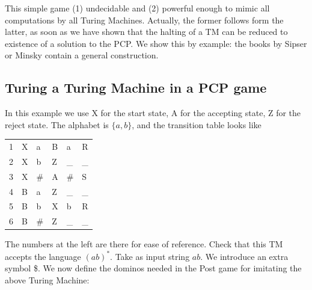 This simple game (1) undecidable and (2) powerful enough to mimic all
computations by all Turing Machines. Actually, the former follows form
the latter, as soon as we have shown that the halting of a TM can be
reduced to existence of a solution to the PCP. We show this by
example: the books by Sipser or Minsky contain a general construction.

\subsection{Turing a Turing Machine in a PCP game}

In this example we use X for the start state, A for the accepting
state, Z for the reject state. The alphabet is $\{a,b\}$, and the
transition table looks like

\begin{center}
\begin{tabular}{|r||l|l||l|l|l|}
\hline
1 & X & a & B & a & R \\
2 & X & b & Z & \_ & \_ \\
3 & X & \# & A & \# & S \\
4 & B & a  & Z & \_ & \_ \\
5 & B & b  & X & b  & R  \\
6 & B & \# & Z & \_ & \_ \\
\hline
\end{tabular}
\end{center}

The numbers at the left are there for ease of reference. Check that
this TM accepts the language $(ab)^*$. Take as input string $ab$.
%
We introduce an extra symbol \$. We now define the dominos needed in
the Post game for imitating the above Turing Machine:

